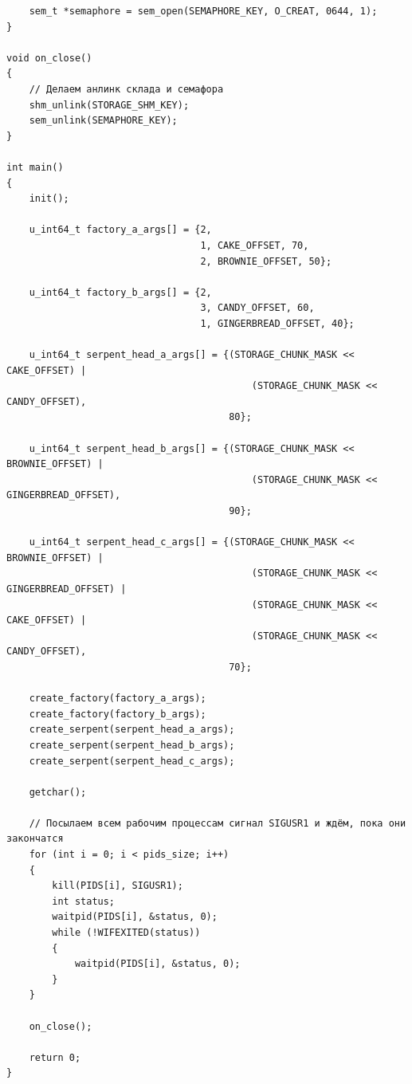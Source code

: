 \documentclass[a4paper,14pt]{extarticle}
\begin{document}
\begin{verbatim}
    sem_t *semaphore = sem_open(SEMAPHORE_KEY, O_CREAT, 0644, 1);
}

void on_close()
{
    // Делаем анлинк склада и семафора
    shm_unlink(STORAGE_SHM_KEY);
    sem_unlink(SEMAPHORE_KEY);
}

int main()
{
    init();

    u_int64_t factory_a_args[] = {2,
                                  1, CAKE_OFFSET, 70,
                                  2, BROWNIE_OFFSET, 50};

    u_int64_t factory_b_args[] = {2,
                                  3, CANDY_OFFSET, 60,
                                  1, GINGERBREAD_OFFSET, 40};

    u_int64_t serpent_head_a_args[] = {(STORAGE_CHUNK_MASK << CAKE_OFFSET) |
                                           (STORAGE_CHUNK_MASK << CANDY_OFFSET),
                                       80};

    u_int64_t serpent_head_b_args[] = {(STORAGE_CHUNK_MASK << BROWNIE_OFFSET) |
                                           (STORAGE_CHUNK_MASK << GINGERBREAD_OFFSET),
                                       90};

    u_int64_t serpent_head_c_args[] = {(STORAGE_CHUNK_MASK << BROWNIE_OFFSET) |
                                           (STORAGE_CHUNK_MASK << GINGERBREAD_OFFSET) |
                                           (STORAGE_CHUNK_MASK << CAKE_OFFSET) |
                                           (STORAGE_CHUNK_MASK << CANDY_OFFSET),
                                       70};

    create_factory(factory_a_args);
    create_factory(factory_b_args);
    create_serpent(serpent_head_a_args);
    create_serpent(serpent_head_b_args);
    create_serpent(serpent_head_c_args);

    getchar();

    // Посылаем всем рабочим процессам сигнал SIGUSR1 и ждём, пока они закончатся
    for (int i = 0; i < pids_size; i++)
    {
        kill(PIDS[i], SIGUSR1);
        int status;
        waitpid(PIDS[i], &status, 0);
        while (!WIFEXITED(status))
        {
            waitpid(PIDS[i], &status, 0);
        }
    }

    on_close();

    return 0;
}
\end{verbatim}
\end{document}
